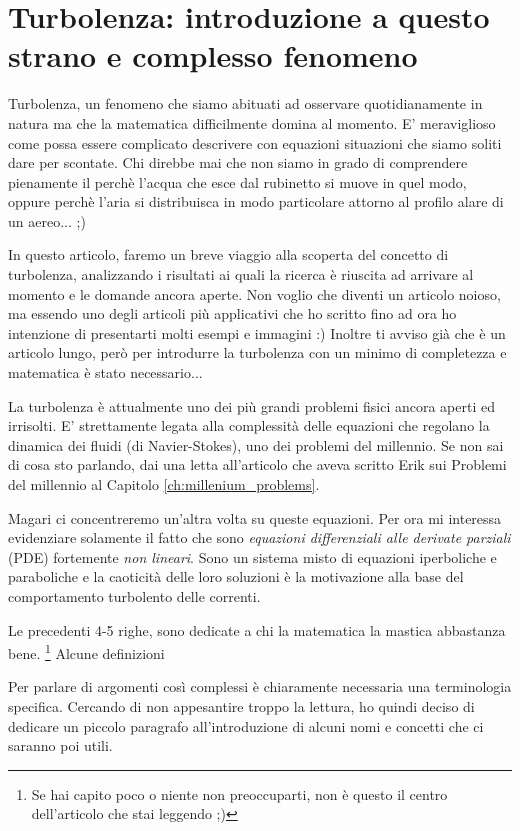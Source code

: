 \chapter{Turbolenza: introduzione a questo strano e complesso fenomeno}
Turbolenza, un fenomeno che siamo abituati ad osservare quotidianamente in natura ma che la matematica difficilmente domina al momento. E' meraviglioso come possa essere complicato descrivere con equazioni situazioni che siamo soliti dare per scontate. Chi direbbe mai che non siamo in grado di comprendere pienamente il perchè l'acqua che esce dal rubinetto si muove in quel modo, oppure perchè l'aria si distribuisca in modo particolare attorno al profilo alare di un aereo... ;)

In questo articolo, faremo un breve viaggio alla scoperta del concetto di turbolenza, analizzando i risultati ai quali la ricerca è riuscita ad arrivare al momento e le domande ancora aperte. Non voglio che diventi un articolo noioso, ma essendo uno degli articoli più applicativi che ho scritto fino ad ora ho intenzione di presentarti molti esempi e immagini :) Inoltre ti avviso già che è un articolo lungo, però per introdurre la turbolenza con un minimo di completezza e matematica è stato necessario...

La turbolenza è attualmente uno dei più grandi problemi fisici ancora aperti ed irrisolti. E' strettamente legata alla complessità delle equazioni che regolano la dinamica dei fluidi (di Navier-Stokes), uno dei problemi del millennio. Se non sai di cosa sto parlando, dai una letta all'articolo che aveva scritto Erik sui Problemi del millennio al Capitolo \ref{ch:millenium_problems}.

Magari ci concentreremo un'altra volta su queste equazioni. Per ora mi interessa evidenziare solamente il fatto che sono \textit{equazioni differenziali alle derivate parziali} (PDE) fortemente \emph{non lineari}. Sono un sistema misto di equazioni iperboliche e paraboliche e la caoticità delle loro soluzioni è la motivazione alla base del comportamento turbolento delle correnti.

Le precedenti 4-5 righe, sono dedicate a chi la matematica la mastica abbastanza bene. 
\footnote{Se hai capito poco o niente non preoccuparti, non è questo il centro dell'articolo che stai leggendo ;)}
Alcune definizioni

Per parlare di argomenti così complessi è chiaramente necessaria una terminologia specifica. Cercando di non appesantire troppo la lettura, ho quindi deciso di dedicare un piccolo paragrafo all'introduzione di alcuni nomi e concetti che ci saranno poi utili.

